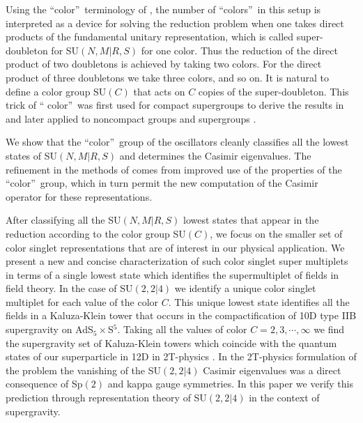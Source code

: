 \documentclass[a4paper,aps,preprint,nofootinbib]{revtex4}
\begin{document}
Using the \textquotedblleft color\textquotedblright\ terminology of \cite%
{barsgunaydin}, the number of \textquotedblleft colors\textquotedblright\ in
this setup is interpreted as a device for solving the reduction problem when
one takes direct products of the fundamental unitary representation, which
is called super-doubleton for SU$(N,M|R,S)$ for one color. Thus the
reduction of the direct product of two doubletons is achieved by taking two
colors. For the direct product of three doubletons we take three colors, and
so on. It is natural to define a color group SU$\left( C\right) $ that acts
on $C$ copies of the super-doubleton. This trick of \textquotedblleft
color\textquotedblright\ was first used for compact supergroups to derive
the results in \cite{BB} and later applied to noncompact groups \cite{GS}
and supergroups \cite{barsgunaydin}.

We show that the \textquotedblleft color\textquotedblright\ group of the
oscillators cleanly classifies all the lowest states of SU$(N,M|R,S)$ and
determines the Casimir eigenvalues. The refinement in the methods of \cite%
{barsgunaydin} comes from improved use of the properties of the
\textquotedblleft color\textquotedblright\ group, which in turn permit the
new computation of the Casimir operator for these representations.

After classifying all the SU$(N,M|R,S)$ lowest states that appear in the
reduction according to the color group SU$\left( C\right) $, we focus on the
smaller set of color singlet representations that are of interest in our
physical application. We present a new and concise characterization of such
color singlet super multiplets in terms of a single lowest state which
identifies the supermultiplet of fields in field theory. In the case of SU$
\left( 2,2|4\right) $ we identify a unique color singlet multiplet for each
value of the color $C.$ This unique lowest state identifies all the fields
in a Kaluza-Klein tower that occurs in the compactification of 10D type IIB
supergravity on AdS$_{5}\times $S$^{5}.$ Taking all the values of color $%
C=2,3,\cdots ,\infty $ we find the supergravity set of Kaluza-Klein towers
which coincide with the quantum states of our superparticle in 12D in
2T-physics \cite{AdS5S5}. In the 2T-physics formulation of the problem the
vanishing of the SU$\left( 2,2|4\right) $ Casimir eigenvalues was a direct
consequence of Sp$\left( 2\right) $ and kappa gauge symmetries. In this
paper we verify this prediction through representation theory of SU$\left(
2,2|4\right) $ in the context of supergravity.
\end{document}
